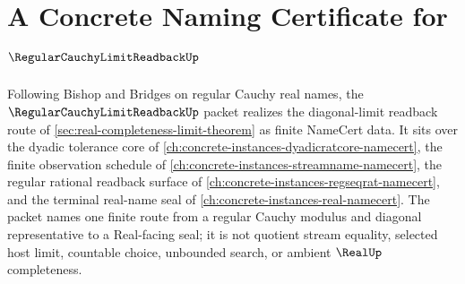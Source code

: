 \chapter{A Concrete Naming Certificate for $\RegularCauchyLimitReadbackUp$}
\label{ch:concrete-instances-regular-cauchy-limit-readback-namecert}

Following Bishop and Bridges on regular Cauchy real names, the $\RegularCauchyLimitReadbackUp$ packet realizes the diagonal-limit readback route of \autoref{sec:real-completeness-limit-theorem} as finite NameCert data. It sits over the dyadic tolerance core of \autoref{ch:concrete-instances-dyadicratcore-namecert}, the finite observation schedule of \autoref{ch:concrete-instances-streamname-namecert}, the regular rational readback surface of \autoref{ch:concrete-instances-regseqrat-namecert}, and the terminal real-name seal of \autoref{ch:concrete-instances-real-namecert}. The packet names one finite route from a regular Cauchy modulus and diagonal representative to a Real-facing seal; it is not quotient stream equality, selected host limit, countable choice, unbounded search, or ambient $\RealUp$ completeness.

